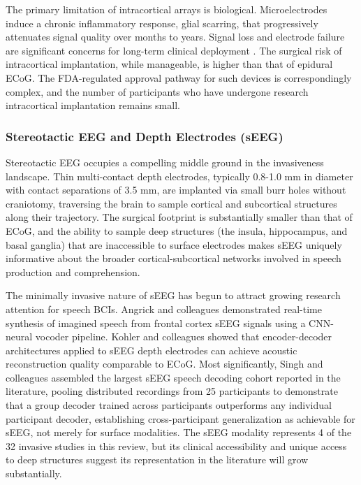 The primary limitation of intracortical arrays is biological. Microelectrodes induce a chronic inflammatory response, glial scarring, that progressively attenuates signal quality over months to years. Signal loss and electrode failure are significant concerns for long-term clinical deployment \cite{Vansteensel2023}. The surgical risk of intracortical implantation, while manageable, is higher than that of epidural ECoG. The FDA-regulated approval pathway for such devices is correspondingly complex, and the number of participants who have undergone research intracortical implantation remains small.

\subsubsection{Stereotactic EEG and Depth Electrodes (sEEG)}

Stereotactic EEG occupies a compelling middle ground in the invasiveness landscape. Thin multi-contact depth electrodes, typically 0.8-1.0 mm in diameter with contact separations of 3.5 mm, are implanted via small burr holes without craniotomy, traversing the brain to sample cortical and subcortical structures along their trajectory. The surgical footprint is substantially smaller than that of ECoG, and the ability to sample deep structures (the insula, hippocampus, and basal ganglia) that are inaccessible to surface electrodes makes sEEG uniquely informative about the broader cortical-subcortical networks involved in speech production and comprehension.

The minimally invasive nature of sEEG has begun to attract growing research attention for speech BCIs. Angrick and colleagues \cite{Angrick2021} demonstrated real-time synthesis of imagined speech from frontal cortex sEEG signals using a CNN-neural vocoder pipeline. Kohler and colleagues \cite{Kohler2022} showed that encoder-decoder architectures applied to sEEG depth electrodes can achieve acoustic reconstruction quality comparable to ECoG. Most significantly, Singh and colleagues \cite{Singh2025} assembled the largest sEEG speech decoding cohort reported in the literature, pooling distributed recordings from 25 participants to demonstrate that a group decoder trained across participants outperforms any individual participant decoder, establishing cross-participant generalization as achievable for sEEG, not merely for surface modalities. The sEEG modality represents 4 of the 32 invasive studies in this review, but its clinical accessibility and unique access to deep structures suggest its representation in the literature will grow substantially.

